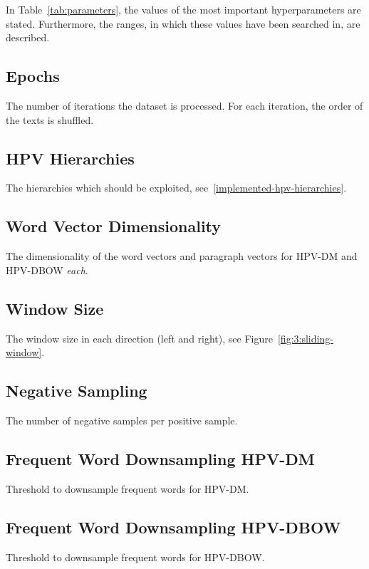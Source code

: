 In Table~\ref{tab:parameters}, the values of the most important hyperparameters are stated. Furthermore, the ranges, in which these values have been searched in, are described.

\subsection{Epochs}

The number of iterations the dataset is processed. For each iteration, the order of the texts is shuffled.

\subsection{HPV Hierarchies}

The hierarchies which should be exploited, see~\ref{implemented-hpv-hierarchies}.

\subsection{Word Vector Dimensionality}

The dimensionality of the word vectors and paragraph vectors for HPV-DM and HPV-DBOW \emph{each}.

\subsection{Window Size}

The window size in each direction (left and right), see Figure~\ref{fig:3:sliding-window}.

\subsection{Negative Sampling}

The number of negative samples per positive sample.

\subsection{Frequent Word Downsampling HPV-DM}

Threshold to downsample frequent words for HPV-DM\@.

\subsection{Frequent Word Downsampling HPV-DBOW}

Threshold to downsample frequent words for HPV-DBOW\@.

